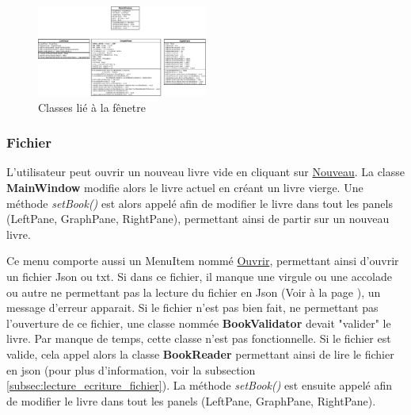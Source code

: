 			\begin{figure}[H]
				\centering\includegraphics[width=0.50\textwidth]{img/fenetre.png}
				\caption{Classes lié à la fênetre}
				\label{fig:fenetre}
			\end{figure}

			\subsubsection{Fichier}
				L'utilisateur peut ouvrir un nouveau livre vide en cliquant sur \underline{Nouveau}. La classe \textbf{MainWindow} modifie alors le livre actuel en créant un livre vierge. Une méthode \textit{setBook()} est alors appelé afin de modifier le livre dans tout les panels (LeftPane, GraphPane, RightPane), permettant ainsi de partir sur un nouveau livre.

				Ce menu comporte aussi un MenuItem nommé \underline{Ouvrir}, permettant ainsi d'ouvrir un fichier Json ou txt. Si dans ce fichier, il manque une virgule ou une accolade ou autre ne permettant pas la lecture du fichier en Json (Voir  à la page \pageref{sec:Json}), un message d'erreur apparait. Si le fichier n'est pas bien fait, ne permettant pas l'ouverture de ce fichier, une classe nommée \textbf{BookValidator} devait "valider" le livre. Par manque de temps, cette classe n'est pas fonctionnelle. Si le fichier est valide, cela appel alors la classe \textbf{BookReader} permettant ainsi de lire le fichier en json (pour plus d'information, voir la subsection \ref{subsec:lecture_ecriture_fichier}). La méthode \textit{setBook()} est ensuite appelé afin de modifier le livre dans tout les panels (LeftPane, GraphPane, RightPane).

